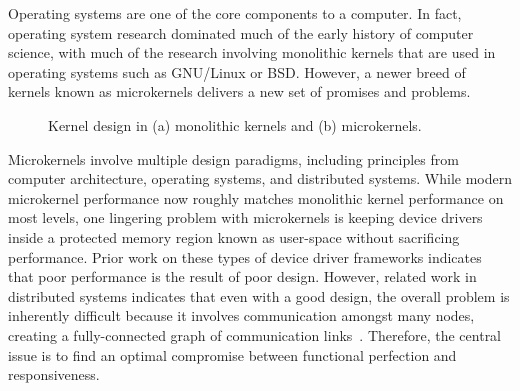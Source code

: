 
Operating systems are one of the core components to a computer.
In fact, operating system research dominated much of the
early history of computer science, with much of the research
involving monolithic kernels that are used in operating systems
such as GNU/Linux or BSD.  However, a newer breed of kernels known
as microkernels delivers a new set of promises and problems.

	\begin{figure}[tb]
	\begin{center}
	\end{center}
	\caption{Kernel design in (a) monolithic kernels and (b)
	microkernels.}%
	\label{fig:kernel_design}
	\end{figure}


Microkernels involve multiple design paradigms, including principles from
computer architecture, operating systems, and distributed systems.
%
%
While modern microkernel performance now roughly matches monolithic
kernel performance on most levels, one lingering problem with
microkernels is keeping device
drivers inside a protected memory region known as user-space without
sacrificing performance.  Prior work on these types of
device driver frameworks indicates that poor performance
is the result of poor design.  However, related work in 
distributed systems indicates that even with a good design, the
overall problem is inherently difficult because it involves
communication amongst many nodes, creating a fully-connected graph of
communication links~\cite{cormen2001, tanenbaum2002}.
Therefore, the central issue is to find an optimal compromise between
functional perfection and responsiveness.


